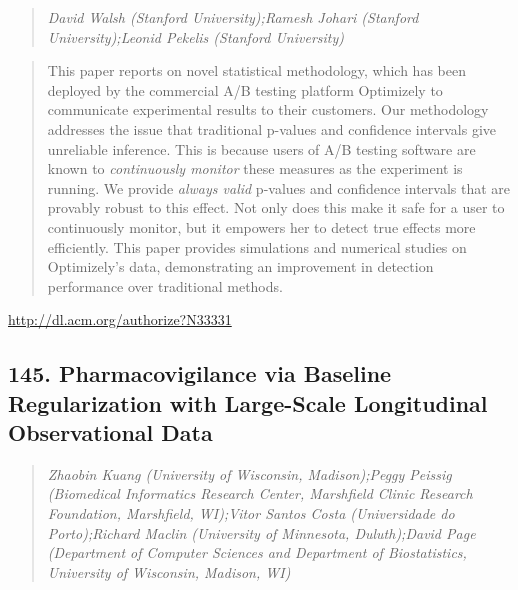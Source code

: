 \documentclass{article}
\begin{document}
\begin{quote}
\footnotesize{\textit{David Walsh (Stanford University);Ramesh Johari (Stanford University);Leonid Pekelis (Stanford University)}}

\end{quote}

\begin{quote}
This paper reports on novel statistical methodology, which has been deployed by the commercial A/B testing platform Optimizely to communicate experimental results to their customers. Our methodology addresses the issue that traditional p-values and confidence intervals give unreliable inference. This is because users of A/B testing software are known to {\em continuously monitor} these measures as the experiment is running. We provide {\em always valid} p-values and confidence intervals that are provably robust to this effect. Not only does this make it safe for a user to continuously monitor, but it empowers her to detect true effects more efficiently. This paper provides simulations and numerical studies on Optimizely’s data, demonstrating an improvement in detection performance over traditional methods.
\end{quote}

\href{http://dl.acm.org/authorize?N33331}{http://dl.acm.org/authorize?N33331}

\subsection{145. Pharmacovigilance via Baseline Regularization with Large-Scale Longitudinal Observational Data}

\begin{quote}
\footnotesize{\textit{Zhaobin Kuang (University of Wisconsin, Madison);Peggy Peissig (Biomedical Informatics Research Center, Marshfield Clinic Research Foundation, Marshfield, WI);Vitor Santos Costa (Universidade do Porto);Richard Maclin (University of Minnesota, Duluth);David Page (Department of Computer Sciences and Department of Biostatistics, University of Wisconsin, Madison, WI)}}

\end{quote}
\end{document}
